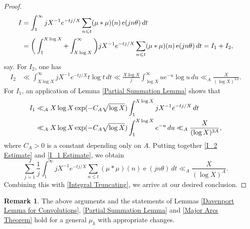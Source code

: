 \documentclass[11pt]{amsart}
\numberwithin{equation}{section}
\numberwithin{figure}{section}
\theoremstyle{definition}
\newtheorem{remark}{Remark}[section]
\newcommand{\e}{\operatorname{e}}
\begin{document}
\begin{proof}
\begin{align}
  I &= \int_1^\infty jX^{-1}e^{-tj/X} \sum_{n \leqslant t}  (\mu * \mu)(n) \e(j n \theta) \, dt \notag \\
  &= \bigg(\int_1^{X \log X} + \int_{X\log X}^\infty\bigg) jX^{-1}e^{-tj/X} \sum_{n \leqslant t}  (\mu * \mu)(n) \e(j n \theta) \, dt = I_1+I_2 \notag, 
\end{align}
say. For $I_2$, one has
\begin{align}
    I_2 & \ll   \int_{X\log X}^\infty jX^{-1}e^{-tj/X} t \log t \, dt  \ll \frac{X \log X}{j} \int_{\log X}^\infty ue^{-u} \log u  \, du \ll_A \frac{X}{(\log X)^{3A}}. \label{I_2 Estimate}
\end{align}
For $I_1$, an application of Lemma \ref{Partial Summation Lemma} shows that
\begin{align}\label{I_1 Estimate}
    I_1 & \ll_A X \log X \exp(-C_A \sqrt{\log X})  \int_1^{X\log X} jX^{-1}e^{-tj/X} \, dt \notag \\
   & \ll_A X \log X \exp(-C_A \sqrt{\log X}) \int_{1}^{X\log X} e^{-u}   \, du \ll_A \frac{X}{(\log X)^{3A}},
\end{align}
where $C_A>0$ is a constant depending only on $A$. Putting together \eqref{I_2 Estimate} and \eqref{I_1 Estimate}, we obtain
\[ \sum_{j=1}^J \frac{1}{j} \int_1^\infty jX^{-1}e^{-tj/X} \sum_{n \leqslant t}  (\mu * \mu)(n) \e(j n \theta) \, dt \ll_A \frac{X}{(\log X)^{A}}.
\]
Combining this with \eqref{Integral Truncating}, we arrive at our desired conclusion.
\end{proof}
\begin{remark}
The above arguments and the statements of Lemmas \ref{Davenport Lemma for Convolutions}, \ref{Partial Summation Lemma} and \ref{Major Arcs Theorem} hold for a general $\mu_k$ with appropriate changes.
\end{remark}
\end{document}
